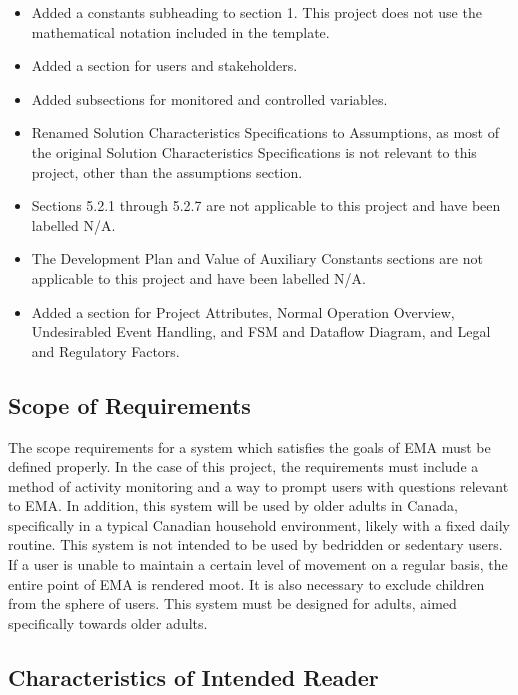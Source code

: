 \documentclass[12pt]{article}
\begin{document}
\begin{itemize}
	\item Added a constants subheading to section 1. This project does not use the mathematical notation included in the template.
	\item Added a section for users and stakeholders.
	\item Added subsections for monitored and controlled variables.
	\item Renamed Solution Characteristics Specifications to Assumptions, as most of the original Solution Characteristics Specifications is not relevant to this project, other than the 					assumptions section.
	\item Sections 5.2.1 through 5.2.7 are not applicable to this project and have been labelled N/A.
	\item The Development Plan and Value of Auxiliary Constants sections are not applicable to this project and have been labelled N/A.
	\item Added a section for Project Attributes, Normal Operation Overview, Undesirabled Event Handling, and FSM and Dataflow Diagram, and Legal and Regulatory Factors.
\end{itemize}

\subsection{Scope of Requirements}

The scope requirements for a system which satisfies the goals of EMA must be defined properly. In the case of this project, the requirements must include a method of activity monitoring and a way to prompt users with questions relevant to EMA. In addition, this system will be used by older adults in Canada, specifically in a typical Canadian household environment, likely with a fixed daily routine. This system is not intended to be used by bedridden or sedentary users. If a user is unable to maintain a certain level of movement on a regular basis, the entire point of EMA is rendered moot. It is also necessary to exclude children from the sphere of users. This system must be designed for adults, aimed specifically towards older adults.\\

\subsection{Characteristics of Intended Reader} \label{sec_IntendedReader}
\end{document}
